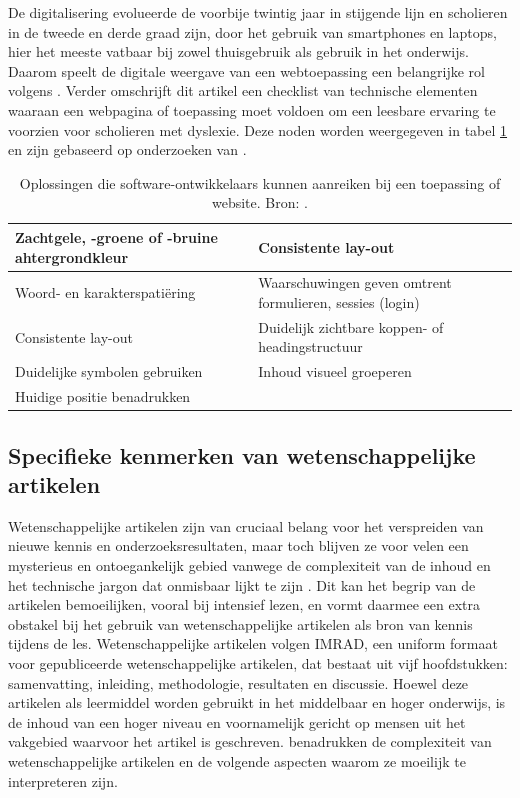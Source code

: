 \medspace

De digitalisering evolueerde de voorbije twintig jaar in stijgende lijn en scholieren in de tweede en derde graad zijn, door het gebruik van smartphones en laptops, hier het meeste vatbaar bij zowel thuisgebruik als gebruik in het onderwijs. Daarom speelt de digitale weergave van een webtoepassing een belangrijke rol volgens \textcite{Harvard2023}. Verder omschrijft dit artikel een checklist van technische elementen waaraan een webpagina of toepassing moet voldoen om een leesbare ervaring te voorzien voor scholieren met dyslexie. Deze noden worden weergegeven in tabel \ref{table:dyslexia-necessaries} en zijn gebaseerd op onderzoeken van \textcite{Santana2012, Harvard2023}.

\begin{center}
		\begin{table}[H]
	\begin{tabular}{ | m{8cm} | m{8cm} | } 
		\hline
		Zachtgele, -groene of -bruine ahtergrondkleur & Consistente lay-out \\
		\hline
		Woord- en karakterspatiëring & Waarschuwingen geven omtrent formulieren, sessies (login) \\ 
		\hline
		Consistente lay-out & Duidelijk zichtbare koppen- of headingstructuur \\ 
		\hline
		Duidelijke symbolen gebruiken &  Inhoud visueel groeperen \\
		\hline
		Huidige positie benadrukken &  \\
		\hline
	\end{tabular}
	\caption{Oplossingen die software-ontwikkelaars kunnen aanreiken bij een toepassing of website. Bron: \autocite{Harvard2023}.}
	\label{table:dyslexia-necessaries}
	\end{table}
\end{center}

\subsection{Specifieke kenmerken van wetenschappelijke artikelen}

Wetenschappelijke artikelen zijn van cruciaal belang voor het verspreiden van nieuwe kennis en onderzoeksresultaten, maar toch blijven ze voor velen een mysterieus en ontoegankelijk gebied vanwege de complexiteit van de inhoud en het technische jargon dat onmisbaar lijkt te zijn \autocite{Ball2017}. Dit kan het begrip van de artikelen bemoeilijken, vooral bij intensief lezen, en vormt daarmee een extra obstakel bij het gebruik van wetenschappelijke artikelen als bron van kennis tijdens de les. Wetenschappelijke artikelen volgen IMRAD, een uniform formaat voor gepubliceerde wetenschappelijke artikelen, dat bestaat uit vijf hoofdstukken: samenvatting, inleiding, methodologie, resultaten en discussie. Hoewel deze artikelen als leermiddel worden gebruikt in het middelbaar en hoger onderwijs, is de inhoud van een hoger niveau en voornamelijk gericht op mensen uit het vakgebied waarvoor het artikel is geschreven. \textcite{Pain2016, CAS2021} benadrukken de complexiteit van wetenschappelijke artikelen en de volgende aspecten waarom ze moeilijk te interpreteren zijn.

